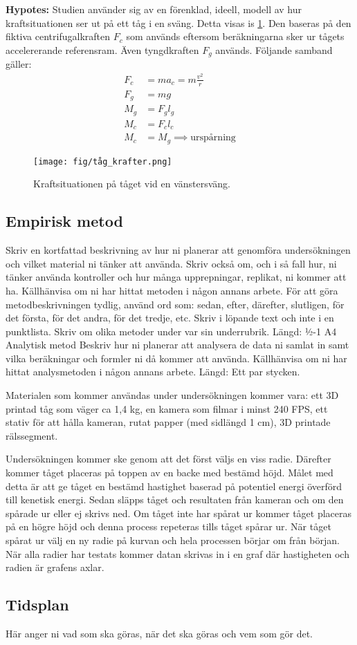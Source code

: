 \textbf{Hypotes:} Studien använder sig av en förenklad, ideell, modell av hur kraftsituationen ser ut på ett tåg i en sväng. Detta visas is \cref{fig:tag_krafter_sväng}. Den baseras på den fiktiva centrifugalkraften $F_c$ som används eftersom beräkningarna sker ur tågets accelererande referensram. Även tyngdkraften $F_g$ används. Följande samband gäller:
\begin{align}
    F_c &= ma_c = m\frac{v^2}{r} \\
    F_g &= mg \\
    M_g &= F_gl_g \\
    M_c &=  F_cl_c \\
    M_c &= M_g \implies \text{urspårning}
\end{align}

\begin{figure}[h!]
    \centering
    \texttt{[image: fig/tåg\_krafter.png]}
    \caption{Kraftsituationen på tåget vid en vänstersväng.}
    \label{fig:tag_krafter_sväng}
\end{figure}

\subsection{Empirisk metod}
Skriv en kortfattad beskrivning av hur ni planerar att genomföra undersökningen och vilket material ni tänker att använda. Skriv också om, och i så fall hur, ni tänker använda kontroller och hur många upprepningar, replikat, ni kommer att ha. Källhänvisa om ni har hittat metoden i någon annans arbete. För att göra metodbeskrivningen tydlig, använd ord som: sedan, efter, därefter, slutligen, för det första, för det andra, för det tredje, etc. Skriv i löpande text och inte i en punktlista. Skriv om olika metoder under var sin underrubrik.
Längd: ½-1 A4
Analytisk metod
Beskriv hur ni planerar att analysera de data ni samlat in samt vilka beräkningar och formler ni då kommer att använda. Källhänvisa om ni har hittat analysmetoden i någon annans arbete.
Längd: Ett par stycken.

Materialen som kommer användas under undersökningen kommer vara: ett 3D printad tåg som väger ca 1,4 kg, en kamera som filmar i minst 240 FPS, ett stativ för att hålla kameran, rutat papper (med sidlängd 1 cm), 3D printade rälssegment. 

Undersökningen kommer ske genom att det först väljs en viss radie. Därefter kommer tåget placeras på toppen av en backe med bestämd höjd. Målet med detta är att ge tåget en bestämd hastighet baserad på potentiel energi överförd till kenetisk energi. Sedan släpps tåget och resultaten från kameran och om den spårade ur eller ej skrivs ned. Om tåget inte har spårat ur kommer tåget placeras på en högre höjd och denna process repeteras tills tåget spårar ur. När tåget spårat ur välj en ny radie på kurvan och hela processen börjar om från början. När alla radier har testats kommer datan skrivas in i en graf där hastigheten och radien är grafens axlar.



\subsection{Tidsplan}
Här anger ni vad som ska göras, när det ska göras och vem som gör det.